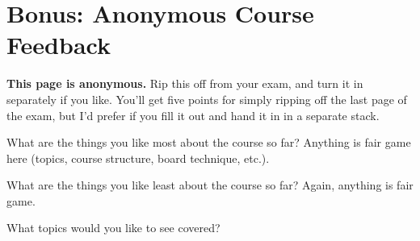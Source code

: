 \documentclass[11pt]{article}
\begin{document}
\newpage
\section{Bonus: Anonymous Course Feedback}

{\bf This page is anonymous.}  Rip this off from your exam, and turn it
in separately if you like.  You'll get five points for simply ripping
off the last page of the exam, but I'd prefer if you fill it out and
hand it in in a separate stack.
\vspace{.5in}

What are the things you like most about the course so far?  Anything is
fair game here (topics, course structure, board technique, etc.).
\vspace{1.5in}


What are the things you like least about the course so far?  Again,
anything is fair game.
\vspace{1in}


What topics would you like to see covered?
\vspace{1in}



\label{lastpage}
\end{document}
